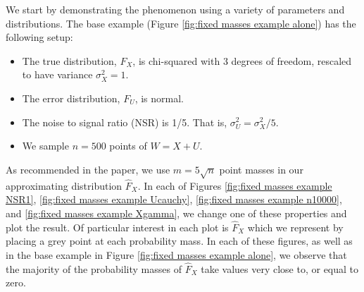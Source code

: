 	We start by demonstrating the phenomenon using a variety of parameters and distributions. The base example (Figure \ref{fig:fixed masses example alone}) has the following setup:

	\begin{itemize}
		\item The true distribution, $F_X$, is chi-squared with 3 degrees of freedom, rescaled to have variance $\sigma_X^2 = 1$.
		\item The error distribution, $F_U$, is normal.
		\item The noise to signal ratio (NSR) is 1/5. That is, $\sigma_U^2 = \sigma_X^2 / 5$.
		\item We sample $n = 500$ points of $W = X+U$.
	\end{itemize}

	As recommended in the paper, we use $m = 5\sqrt{n}$ point masses in our approximating distribution $\hat{F}_X$. In each of Figures \ref{fig:fixed masses example NSR1}, \ref{fig:fixed masses example Ucauchy}, \ref{fig:fixed masses example n10000}, and \ref{fig:fixed masses example Xgamma}, we change one of these properties and plot the result. Of particular interest in each plot is $\hat{F}_X$ which we represent by placing a grey point at each probability mass. In each of these figures, as well as in the base example in Figure \ref{fig:fixed masses example alone}, we observe that the majority of the probability masses of $\hat{F}_X$ take values very close to, or equal to zero.


